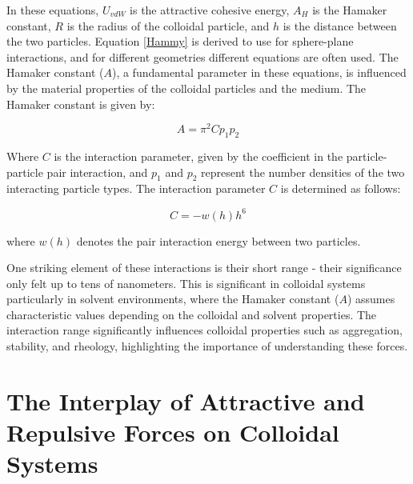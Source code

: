 

In these equations, \(U_{vdW}\) is the attractive cohesive energy, \(A_H\) is the Hamaker constant, \(R\) is the radius of the colloidal particle, and \(h\) is the distance between the two particles. Equation \ref{Hammy} is derived to use for sphere-plane interactions, and for different geometries different equations are often used. The Hamaker constant (\(A\)), a fundamental parameter in these equations, is influenced by the material properties of the colloidal particles and the medium. The Hamaker constant is given by:

\begin{equation} %
A = \pi^2 C p_1 p_2
\end{equation}


Where \(C\) is the interaction parameter, given by the coefficient in the particle-particle pair interaction, and \(p_1\) and \(p_2\) represent the number densities of the two interacting particle types. \cite{FoundColloidBook} The interaction parameter \(C\) is determined as follows:

\begin{equation}
C = -w(h) h^6
\end{equation}

where \(w(h)\) denotes the pair interaction energy between two particles. 

One striking element of these interactions is their short range - their significance only felt up to tens of nanometers. This is significant in colloidal systems particularly in solvent environments, where the Hamaker constant (\(A\)) assumes characteristic values depending on the colloidal and solvent properties. The interaction range significantly influences colloidal properties such as aggregation, stability, and rheology, highlighting the importance of understanding these forces.\cite{israelachvili2011intermolecular} %

\section{The Interplay of Attractive and Repulsive Forces on Colloidal Systems}

